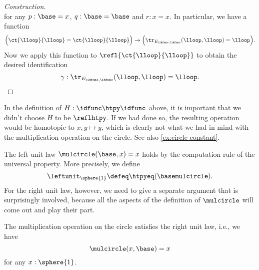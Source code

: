 \begin{proof}[Construction]
\begin{equation*}
  \end{equation*}
  for any $p:\base=x$, $q:\base=\base$ and $r:x=x$. In particular, we have a function
  \begin{equation*}
    \Big(\ct{\lloop}{\lloop}=\ct{\lloop}{\lloop}\Big)\to\Big(\tr_{E_{\idfunc,\idfunc}}(\lloop,\lloop)=\lloop\Big).
  \end{equation*}
  Now we apply this function to $\refl{\ct{\lloop}{\lloop}}$ to obtain the desired identification
  \begin{equation*}
    \gamma:\tr_{E_{\idfunc,\idfunc}}(\lloop,\lloop)=\lloop.\qedhere
  \end{equation*}
\end{proof}

\begin{rmk}
  In the definition of $H:\idfunc\htpy\idfunc$ above, it is important that we didn't choose $H$ to be $\reflhtpy$. If we had done so, the resulting operation would be homotopic to $x,y\mapsto y$, which is clearly not what we had in mind with the multiplication operation on the circle. See also \cref{ex:circle-constant}.
\end{rmk}


The left unit law $\mulcircle(\base,x)=x$ holds by the computation rule of the universal property. More precisely, we define
\begin{equation*}
  \leftunit_{\sphere{1}}\defeq \htpyeq(\basemulcircle).
\end{equation*}
For the right unit law, however, we need to give a separate argument that is surprisingly involved, because all the aspects of the definition of $\mulcircle$ will come out and play their part.

\begin{thm}
  The multiplication operation on the circle satisfies the right unit law, i.e., we have
  \begin{equation*}
    \mulcircle(x,\base)=x
  \end{equation*}
  for any $x:\sphere{1}$.
\end{thm}

